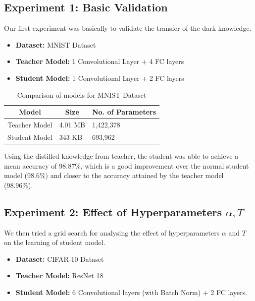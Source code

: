 \documentclass{article} %
\begin{document}
	
	\subsection{Experiment 1: Basic Validation} 
	Our first experiment was basically to validate the transfer of the dark knowledge.
	\begin{itemize}
		\item \textbf{Dataset:} MNIST Dataset
		\item \textbf{Teacher Model:} 1
		Convolutional Layer + 4 FC layers
		\item \textbf{Student Model:} 1 Convolutional Layer + 2 FC layers 
	\end{itemize}
	
	\begin{table}[!htbp]
		\centering
		\caption{Comparison of models for MNIST Dataset}
		\label{tab:my-table}
		\begin{tabular}{@{}cll@{}}
			\toprule
			\textbf{Model} & \multicolumn{1}{c}{\textbf{Size}} & \multicolumn{1}{c}{\textbf{No. of Parameters}} \\ \midrule
			Teacher Model  & 4.01 MB                           & 1,422,378                                      \\
			Student Model  & 343 KB                            & 693,962                                        \\ \bottomrule
		\end{tabular}
	\end{table}
	
	Using the distilled knowledge from teacher, the student was able to achieve a mean accuracy of 98.87\%, which is a good improvement over the normal student model (98.6\%) and closer to the accuracy attained by the teacher model (98.96\%).
	
	
	\subsection{Experiment 2: Effect of Hyperparameters $\alpha, T$} 
	We then tried a grid search for analysing the effect of hyperparameters $\alpha$ and $T$ on the learning of student model.
	\begin{itemize}
		\item \textbf{Dataset:} CIFAR-10 Dataset
		\item \textbf{Teacher Model:} ResNet 18
		\item \textbf{Student Model:} 6 Convolutional layers (with Batch Norm) + 2 FC layers.
	\end{itemize}
	
\end{document}
